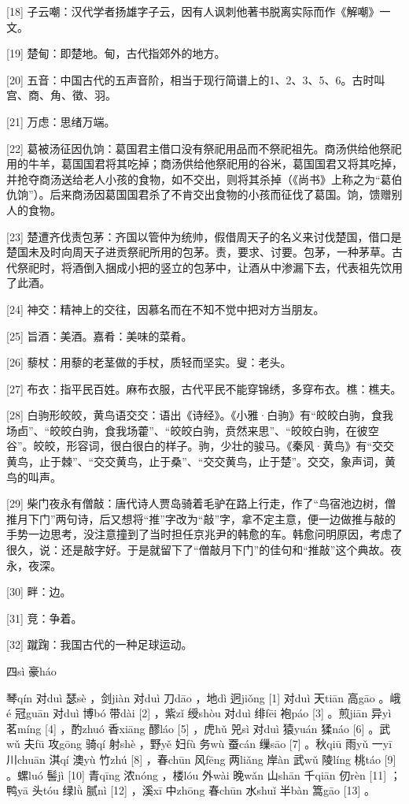 \documentclass[12pt,UTF8]{ctexbook}
\begin{document}
[18] 子云嘲：汉代学者扬雄字子云，因有人讽刺他著书脱离实际而作《解嘲》一文。

[19] 楚甸：即楚地。甸，古代指郊外的地方。

[20] 五音：中国古代的五声音阶，相当于现行简谱上的1、2、3、5、6。古时叫宫、商、角、徵、羽。

[21] 万虑：思绪万端。

[22] 葛被汤征因仇饷：葛国君主借口没有祭祀用品而不祭祀祖先。商汤供给他祭祀用的牛羊，葛国国君将其吃掉；商汤供给他祭祀用的谷米，葛国国君又将其吃掉，并抢夺商汤送给老人小孩的食物，如不交出，则将其杀掉（《尚书》上称之为“葛伯仇饷”）。后来商汤因葛国国君杀了不肯交出食物的小孩而征伐了葛国。饷，馈赠别人的食物。

[23] 楚遭齐伐责包茅：齐国以管仲为统帅，假借周天子的名义来讨伐楚国，借口是楚国未及时向周天子进贡祭祀所用的包茅。责，要求、讨要。包茅，一种茅草。古代祭祀时，将酒倒入捆成小把的竖立的包茅中，让酒从中渗漏下去，代表祖先饮用了此酒。

[24] 神交：精神上的交往，因慕名而在不知不觉中把对方当朋友。

[25] 旨酒：美酒。嘉肴：美味的菜肴。

[26] 藜杖：用藜的老茎做的手杖，质轻而坚实。叟：老头。

[27] 布衣：指平民百姓。麻布衣服，古代平民不能穿锦绣，多穿布衣。樵：樵夫。

[28] 白驹形皎皎，黄鸟语交交：语出《诗经》。《小雅·白驹》有“皎皎白驹，食我场卣”、“皎皎白驹，食我场藿”、“皎皎白驹，贲然来思”、“皎皎白驹，在彼空谷”。皎皎，形容词，很白很白的样子。驹，少壮的骏马。《秦风·黄鸟》有“交交黄鸟，止于棘”、“交交黄鸟，止于桑”、“交交黄鸟，止于楚”。交交，象声词，黄鸟的叫声。

[29] 柴门夜永有僧敲：唐代诗人贾岛骑着毛驴在路上行走，作了“鸟宿池边树，僧推月下门”两句诗，后又想将“推”字改为“敲”字，拿不定主意，便一边做推与敲的手势一边思考，没注意撞到了当时担任京兆尹的韩愈的车。韩愈问明原因，考虑了很久，说：还是敲字好。于是就留下了“僧敲月下门”的佳句和“推敲”这个典故。夜永，夜深。

[30] 畔：边。

[31] 竞：争着。

[32] 蹴踘：我国古代的一种足球运动。





四sì 豪háo


琴qín 对duì 瑟sè ，剑jiàn 对duì 刀dāo ，地dì 迥jiǒng [1] 对duì 天tiān 高gāo 。峨é 冠guān 对duì 博bó 带dài [2] ，紫zǐ 绶shòu 对duì 绯fēi 袍páo [3] 。煎jiān 异yì 茗míng [4] ，酌zhuó 香xiāng 醪láo [5] ，虎hǔ 兕sì 对duì 猿yuán 猱náo [6] 。武wǔ 夫fū 攻gōng 骑qí 射shè ，野yě 妇fù 务wù 蚕cán 缫sāo [7] 。秋qiū 雨yǔ 一yī 川chuān 淇qí 澳yù 竹zhú [8] ，春chūn 风fēng 两liǎng 岸àn 武wǔ 陵líng 桃táo [9] 。螺luó 髻jì [10] 青qīng 浓nóng ，楼lóu 外wài 晚wǎn 山shān 千qiān 仞rèn [11] ；鸭yā 头tóu 绿lǜ 腻nì [12] ，溪xī 中zhōng 春chūn 水shuǐ 半bàn 篙gāo [13] 。
\end{document}
